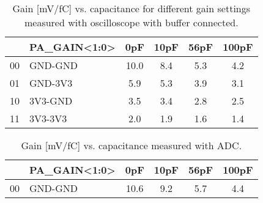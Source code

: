 \documentclass[../main/thesis.tex]{subfiles}
\begin{document}
\begin{table}[h!]
	\begin{center}
		\caption{Gain [mV/fC] vs. capacitance for different gain settings measured with oscilloscope with buffer connected.}
		\label{tab-gain-wbuffer}
		\begin{tabular}{clcccc}\toprule
			&\textbf{PA\_GAIN<1:0>} & \textbf{0pF}  & \textbf{10pF} & \textbf{56pF} & \textbf{100pF} \\ \midrule
			00&GND-GND     & 10.0 & 8.4  & 5.3  & 4.2   \\
			01&GND-3V3    & 5.9    & 5.3  & 3.9    & 3.1   \\
			10&3V3-GND     & 3.5  & 3.4  & 2.8  & 2.5   \\
			11&3V3-3V3     & 2.0    & 1.9  & 1.6  & 1.4 \\ \bottomrule
		\end{tabular}
	\end{center}
\end{table}


\begin{table}[h!]
	\begin{center}
		\caption{Gain [mV/fC] vs. capacitance measured with ADC.}
		\label{tab-gain-adc}
		\begin{tabular}{clcccc}\toprule
			&\textbf{PA\_GAIN<1:0>} & \textbf{0pF}  & \textbf{10pF} & \textbf{56pF} & \textbf{100pF} \\ \midrule
			00 &GND-GND     & 10.6 & 9.2  & 5.7  & 4.4   \\ \bottomrule
		\end{tabular}
	\end{center}
\end{table}
\end{document}
